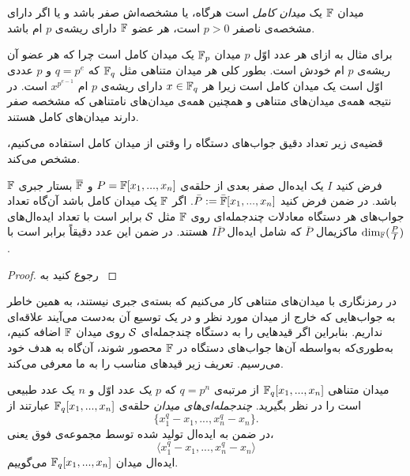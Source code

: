 \begin{definition}
	میدان 
	$\mathbb{F}$
	یک 
	\textit{میدان کامل}
	است هرگاه، یا مشخصه‌اش صفر باشد و یا اگر دارای مشخصه‌ی ناصفر 
	$p>0$
	است، هر عضو 
	$\mathbb{F}$
	دارای ریشه‌ی 
	$p$
	ام باشد.
\end{definition}

برای مثال به ازای هر عدد اوّل 
$p$
میدان
$\mathbb{F}_{p}$
یک میدان کامل است چرا که هر عضو آن ریشه‌ی 
$p$
ام خودش است. بطور کلی هر میدان متناهی مثل 
$\mathbb{F}_{q}$
که 
$q = p^{e}$
و 
$p$
عددی اوّل است یک میدان کامل است زیرا هر 
$x\in\mathbb{F}_{q}$
دارای ریشه‌ی 
$p$
ام 
$x^{p^{e-1}}$
است. در نتیجه همه‌ی میدان‌های متناهی و همچنین همه‌ی میدان‌های نامتناهی که مشخصه صفر دارند میدان‌های کامل هستند.

قضیه‌ی زیر تعداد دقیق جواب‌های دستگاه را وقتی از میدان کامل استفاده می‌کنیم، مشخص می‌کند.

\begin{theorem}
	فرض کنید 
	$I$
	یک ایده‌ال صفر بعدی از حلقه‌ی 
	$P = \mathbb{F}[x_{1},...,x_{n}]$
	و
	$\overline{\mathbb{F}}$
	بستار جبری 
	$\mathbb{F}$
	باشد. در ضمن فرض کنید 
	$\bar{P}:=\bar{\mathbb{F}}[x_{1},...,x_{n}]$.
	اگر 
	$\mathbb{F}$
	یک میدان کامل باشد آن‌گاه تعداد جواب‌های هر دستگاه معادلات چندجمله‌ای روی
	$\mathbb{F}$
	مثل 
	${\mathcal S}$
	برابر است با تعداد ایده‌ال‌های ماکزیمال 
	$\overline{P}$
	که شامل ایده‌ال
	$I\overline{P}$
	هستند. در ضمن این عدد دقیقاً برابر است با 
	$\dim_{\mathbb{F}}(\frac{P}{I})$.
\end{theorem}
\begin{proof}
	رجوع کنید به 
	{\small \cite[ص.۲۵۳]{IVAcox}}
\end{proof}

در رمزنگاری با میدان‌های متناهی کار می‌کنیم که بسته‌ی جبری نیستند، به همین خاطر به جواب‌هایی که خارج از میدان مورد نظر و  در یک توسیع آن به‌دست  می‌آیند علاقه‌ای نداریم. بنابراین اگر قیدهایی را به دستگاه چندجمله‌ای 
${\mathcal S}$
روی میدان 
$\mathbb{F}$
اضافه کنیم، به‌طوری‌که به‌واسطه‌  آن‌ها جواب‌ها‌ی دستگاه در 
$\mathbb{F}$
محصور شوند، آن‌گاه به هدف خود می‌رسیم. تعریف زیر قیدهای مناسب را به ما معرفی می‌کند.
\begin{definition}
	میدان متناهی 
	$\mathbb{F}_{q}[x_{1},...,x_{n}]$
	از مرتبه‌ی 
	$q = p^{n}$
	که
	$p$
	یک عدد اوّل و 
	$n$
	یک عدد طبیعی است را در نظر بگیرید. 
	\textit{چندجمله‌ای‌های میدان}
	حلقه‌ی 
	$\mathbb{F}_{q}[x_{1},...,x_{n}]$
	عبارتند از
	$$\{x_{1}^{q} - x_{1},...,x_{n}^{q} - x_{n}\}.$$
	در ضمن به ایده‌ال تولید شده توسط مجموعه‌ی فوق یعنی، 
	$$\langle x_{1}^{q} - x_{1},...,x_{n}^{q} - x_{n} \rangle$$
	ایده‌ال میدان 
	$\mathbb{F}_{q}[x_{1},...,x_{n}]$
	می‌گوییم. 
\end{definition}

